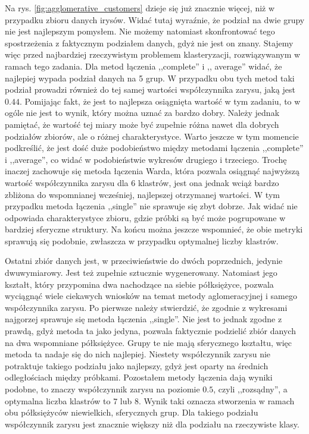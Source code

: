 \documentclass{classrep}
\begin{document}
{{            Na rys. \ref{fig:agglomerative_customers} dzieje się już znacznie więcej,
            niż w przypadku zbioru danych irysów. Widać tutaj wyraźnie, że podział na
            dwie grupy nie jest najlepszym pomysłem. Nie możemy natomiast skonfrontować
            tego spostrzeżenia z faktycznym podziałem danych, gdyż nie jest on znany.
            Stajemy więc przed najbardziej rzeczywistym problemem klasteryzacji,
            rozwiązywanym w ramach tego zadania. Dla metod łączenia ,,complete'' i ,,
            average'' widać, że najlepiej wypada podział danych na 5 grup. W przypadku
            obu tych metod taki podział prowadzi również do tej samej wartości
            współczynnika zarysu, jaką jest $0.44$. Pomijając fakt, że jest to
            najlepsza osiągnięta wartość w tym zadaniu, to w ogóle nie jest to wynik,
            który można uznać za bardzo dobry. Należy jednak pamiętać, że wartość tej
            miary może być zupełnie różna nawet dla dobrych podziałów zbiorów, ale o
            różnej charakterystyce. Warto jeszcze w tym momencie podkreślić, że jest
            dość duże podobieństwo między metodami łączenia ,,complete'' i ,,average'',
            co widać w podobieństwie wykresów drugiego i trzeciego. Trochę inaczej
            zachowuje się metoda łączenia Warda, która pozwala osiągnąć najwyższą
            wartość współczynnika zarysu dla 6 klastrów, jest ona jednak wciąż bardzo
            zbliżona do wspomnianej wcześniej, najlepszej otrzymanej wartości. W tym
            przypadku metoda łączenia ,,single'' nie sprawuje się zbyt dobrze. Jak
            widać nie odpowiada charakterystyce zbioru, gdzie próbki są być może
            pogrupowane w bardziej sferyczne struktury. Na końcu można jeszcze
            wspomnieć, że obie metryki sprawują się podobnie, zwłaszcza w przypadku
            optymalnej liczby klastrów.

            Ostatni zbiór danych jest, w przeciwieństwie do dwóch poprzednich, jedynie
            dwuwymiarowy. Jest też zupełnie sztucznie wygenerowany. Natomiast jego
            kształt, który przypomina dwa nachodzące na siebie półksiężyce, pozwala
            wyciągnąć wiele ciekawych wniosków na temat metody aglomeracyjnej i samego
            współczynnika zarysu. Po pierwsze należy stwierdzić, że zgodnie z wykresami
            najgorzej sprawuje się metoda łączenia ,,single''. Nie jest to jednak
            zgodne z prawdą, gdyż metoda ta jako jedyna, pozwala faktycznie podzielić
            zbiór danych na dwa wspomniane półksiężyce. Grupy te nie mają sferycznego
            kształtu, więc metoda ta nadaje się do nich najlepiej. Niestety
            współczynnik zarysu nie potraktuje takiego podziału jako najlepszy, gdyż
            jest oparty na średnich odległościach między próbkami. Pozostałem metody
            łączenia dają wyniki podobne, to znaczy współczynnik zarysu na poziomie $0.5$,
            czyli ,,rozsądny'', a optymalna liczba klastrów to $7$ lub $8$. Wynik
            taki oznacza stworzenia w ramach obu półksiężyców niewielkich, sferycznych
            grup. Dla takiego podziału współczynnik zarysu jest znacznie większy niż
            dla podziału na rzeczywiste klasy.
        }

}
\end{document}
